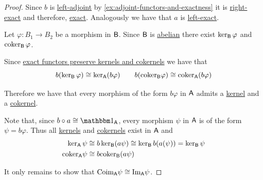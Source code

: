 \documentclass[../../main]{subfiles}
\begin{document}
\begin{proof}
  Since \(b\) is \hyperref[def:adjoint-functors]{left-adjoint} by \autoref{ex:adjoint-functors-and-exactness} it is \hyperref[def:exact-functor]{right-exact} and therefore, \hyperref[def:exact-functor]{exact}.
  Analogously we have that \(a\) is \hyperref[def:exact-functor]{left-exact}.

  Let \(\varphi\colon B_{1} \to B_{2}\) be a morphism in \(\mathsf{B}\).
  Since \(\mathsf{B}\) is \hyperref[def:abelian-category]{abelian} there exist \(\ker_{\mathsf{B}} \varphi\) and \(\operatorname*{coker}_{\mathsf{B}} \varphi\).

  Since \hyperref[lemma:characterization-exact-functor]{exact functors preserve kernels and cokernels} we have that
  \begin{equation*}
    b(\ker_{\mathsf{B}} \varphi) \cong \ker_{\mathsf{A}}(b\varphi) \qquad b(\text{coker}_{\mathsf{B}} \varphi) \cong \text{coker}_{\mathsf{A}}(b\varphi)
  \end{equation*}
  
  Therefore we have that every morphism of the form \(b\varphi\) in \(\mathsf{A}\) admits a \hyperref[def:categorical-kernel]{kernel} and a \hyperref[def:categorical-cokernel]{cokernel}.

  Note that, since \(b \circ a \cong \id_{\category{A}}\), every morphism \(\psi\) in \(\mathsf{A}\) is of the form \(\psi = b\varphi\).
  Thus all \hyperref[def:categorical-kernel]{kernels} and \hyperref[def:categorical-cokernel]{cokernels} exist in \(\mathsf{A}\) and
  \begin{align}\label{eq:ker-coker-lemma}
    \ker_{\mathsf{A}} \psi &\cong b\ker_{\mathsf{B}}(a\psi) \cong \ker_{\mathsf{B}} b(a(\psi)) = \ker_{\mathsf{B}} \psi \\
    \text{coker}_{\mathsf{A}} \psi &\cong b\text{coker}_{\mathsf{B}}(a\psi)
  \end{align}
  
  It only remains to show that \(\text{Coim}_{\mathsf{A}} \psi \cong \text{Im}_{\mathsf{A}} \psi\).


\end{proof}
\end{document}
